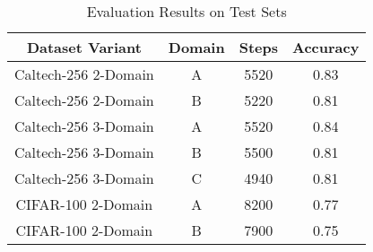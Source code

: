 \begin{table}
\caption{Evaluation Results on Test Sets}
\label{tab:evaluation_results}
\begin{tabular}{cccc}
\toprule
Dataset Variant & Domain & Steps & Accuracy \\
\midrule
Caltech-256 2-Domain & A & 5520 & 0.83 \\
Caltech-256 2-Domain & B & 5220 & 0.81 \\
Caltech-256 3-Domain & A & 5520 & 0.84 \\
Caltech-256 3-Domain & B & 5500 & 0.81 \\
Caltech-256 3-Domain & C & 4940 & 0.81 \\
CIFAR-100 2-Domain & A & 8200 & 0.77 \\
CIFAR-100 2-Domain & B & 7900 & 0.75 \\
\bottomrule
\end{tabular}
\end{table}
